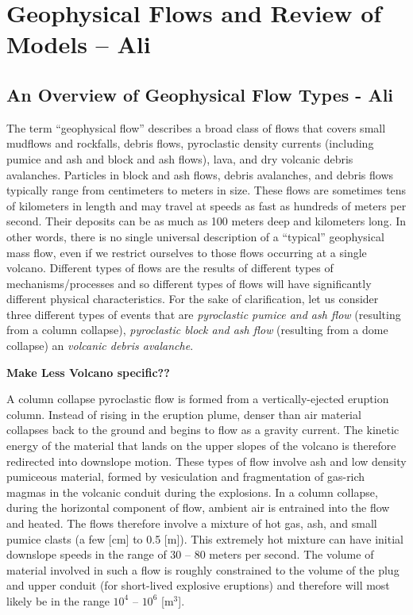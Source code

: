 \documentclass{article}
\begin{document}
\section{Geophysical Flows and Review of Models -- Ali}\label{sec:GeoPhFlows}

\subsection{An Overview of Geophysical Flow Types - Ali}\label{subsec:FlowTypes}
The term ``geophysical flow'' describes a broad class of flows that covers small mudflows and rockfalls, debris flows, pyroclastic density currents (including pumice and ash and block and ash flows), lava, and dry volcanic debris avalanches. Particles in block and ash flows, debris avalanches, and debris flows typically range from centimeters to meters in size. These flows are sometimes tens of kilometers in length and may travel at speeds as fast as hundreds of meters per second. Their deposits can be as much as 100 meters deep and kilometers long. In other words, there is no single universal description of a ``typical'' geophysical mass flow, even if we restrict ourselves to those flows occurring at a single volcano. Different types of flows are the results of different types of mechanisms/processes and so different types of flows will have significantly different physical characteristics. For the sake of clarification, let us consider three different types of events that are \textit{pyroclastic pumice and ash flow} (resulting from a column collapse), \textit{pyroclastic block and ash flow} (resulting from a dome collapse) an \textit{volcanic debris avalanche}.

  {\bf Make Less Volcano specific??}


A column collapse pyroclastic flow is formed from a vertically-ejected eruption column. Instead of rising in the eruption plume, denser than air material collapses back to the ground and begins to flow as a gravity current. The kinetic energy of the material that lands on the upper slopes of the volcano is therefore redirected into downslope motion. These types of flow involve ash and low density pumiceous material, formed by vesiculation and fragmentation of gas-rich magmas in the volcanic conduit during the explosions. In a column collapse, during the horizontal component of flow, ambient air is entrained into the flow and heated. The flows therefore involve a mixture of hot gas, ash, and small pumice clasts (a few [cm] to 0.5 [m]). This extremely hot mixture can have initial downslope speeds in the range of 30 -- 80 meters per second. The volume of material involved in such a flow is roughly constrained to the volume of the plug and upper conduit (for short-lived explosive eruptions) and therefore will most likely be in the range $10^4$ -- $10^6$ [$\mathrm{m^3}$].
\end{document}
